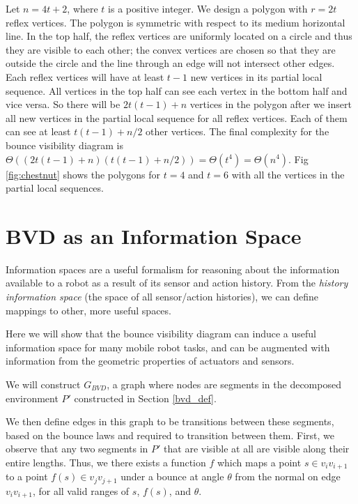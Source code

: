 \documentclass[]{styles/svproc}  %
\begin{document}
Let $n = 4t+2$, where $t$ is a positive integer. We design a polygon with
$r = 2t$ reflex vertices. The polygon is symmetric with respect to its medium
horizontal line. In the top half, the reflex vertices are uniformly located on a
circle and thus they are visible to each other; the convex vertices are chosen
so that they are outside the circle and the line through an edge will not
intersect other edges. Each reflex vertices will have at least $t-1$ new
vertices in its partial local sequence. All vertices in the top half can see
each vertex in the bottom half and vice versa. So there will be $2t(t-1)+n$
vertices in the polygon after we insert all new vertices in the partial local
sequence for all reflex vertices. Each of them can see at least $t(t-1)+n/2$
other vertices. The final complexity for the bounce visibility diagram is
$\Theta ((2t(t-1)+n)(t(t-1)+n/2)) = \Theta (t^4) = \Theta(n^4)$.
Fig \ref{fig:chestnut} shows the polygons for $t = 4$ and $t=6$ with all the
vertices in the partial local sequences. %



\section{BVD as an Information Space \label{bvd_info}}

Information spaces \cite{tovar2005information} are a useful formalism for
reasoning about the information available to a robot as a result of its sensor
and action history. From the \emph{history information space} (the space of all
sensor/action histories), we can define mappings to other, more useful spaces.

Here we will show that the bounce visibility diagram can induce a useful
information space for many mobile robot tasks, and can be augmented with
information from the geometric properties of actuators and sensors.

We will construct $G_{BVD}$, a graph where nodes are segments in the decomposed
environment $P'$ constructed in Section \ref{bvd_def}.

We then define edges in this graph to be transitions between these segments, based on the bounce laws and
required to transition between them. First, we observe that any two segments in
$P'$ that are visible at all are visible along their entire lengths. Thus, we
there exists a function $f$ which maps a point $s \in v_i
v_{i+1}$ to a point $f(s) \in v_j v_{j+1}$ under a bounce at angle $\theta$ from
the normal on edge $v_i v_{i+1}$, for all valid ranges of $s$, $f(s)$, and
$\theta$.
\end{document}
